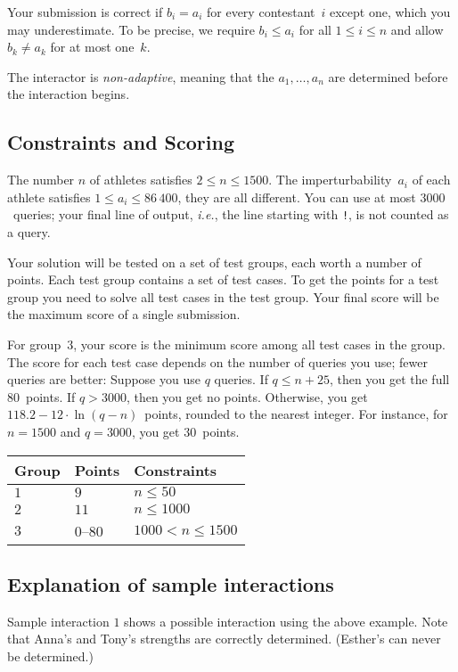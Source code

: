 Your submission is correct if $b_i=a_i$ for every contestant~$i$ except one, which you may underestimate.
To be precise, we require $b_i\leq a_i$ for all $1\leq i\leq n$ and allow $b_k \neq a_k$ for at most one~$k$.

The interactor is \emph{non-adaptive}, meaning that the $a_1,\ldots, a_n$ are determined before the interaction begins.

\subsection*{Constraints and Scoring}

The number $n$ of athletes satisfies 
$2\leq n\leq 1500$. %
The imperturbability~$a_i$ of each athlete satisfies 
$1\leq a_i\leq 86\,400$, %
they are all different. %
You can use 
at most $3000$~queries; %
your final line of output, \emph{i.e.}, the line starting with \texttt{!}, is not counted as a query.

Your solution will be tested on a set of test groups, each worth a number of points.
Each test group contains a set of test cases.
To get the points for a test group you need to solve all test cases in the test group.
Your final score will be the maximum score of a single submission.

For group~$3$, your score is the minimum score among all test cases in the group.
The score for each test case depends on the number of queries you use;
fewer queries are better:
Suppose you use $q$ queries. 
If $q \le n+25$, then you get the full $80$~points. 
If $q > 3000$, then you get no points.
Otherwise, you get 
$118.2 - 12 \cdot \ln(q - n)$~points, rounded to the nearest integer. %
For instance, for $n = 1500$ and $q = 3000$, you get $30$~points.

\medskip
\begin{tabular}{lll}
Group & Points & Constraints\\\hline
$1$  &  $9$ & $n\leq 50$\\
$2$  &  $11$ & $n\leq 1000$\\
$3$  &  $0$--$80$ & $1000 < n\leq 1500$\\
\end{tabular}

\subsection*{Explanation of sample interactions}

Sample interaction $1$ shows a possible interaction using the above example. 
Note that Anna's and Tony's strengths are correctly determined.
(Esther's can never be determined.)
